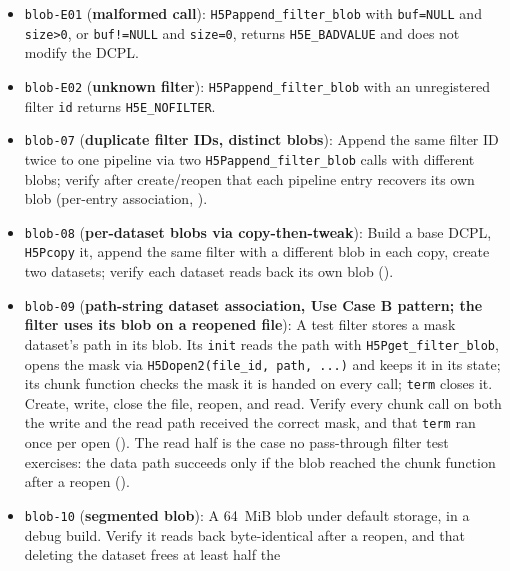 \documentclass[../RFC-HDFG-2026-003.tex]{subfiles}
\begin{document}
\begin{itemize}
  Configure a filter via \texttt{H5Pappend\_filter\_blob} with a
  multi-megabyte buffer using the default \texttt{H5HG}-based storage;
  verify create/open succeeds and the runtime chunk I/O path is
  unaffected (compression throughput on the same file is unchanged
  relative to an equivalent dataset without a blob).
\item \texttt{blob-E01} (\textbf{malformed call}):
  \texttt{H5Pappend\_filter\_blob} with \texttt{buf=NULL} and
  \texttt{size>0}, or \texttt{buf!=NULL} and \texttt{size=0}, returns
  \texttt{H5E\_BADVALUE} and does not modify the DCPL.
\item \texttt{blob-E02} (\textbf{unknown filter}):
  \texttt{H5Pappend\_filter\_blob} with an unregistered filter
  \texttt{id} returns \texttt{H5E\_NOFILTER}.
\item \texttt{blob-07} (\textbf{duplicate filter IDs, distinct blobs}):
  Append the same filter ID twice to one pipeline via two
  \texttt{H5Pappend\_filter\_blob} calls with different blobs; verify
  after create/reopen that each pipeline entry recovers its own blob
  (per-entry association, ).
\item \texttt{blob-08} (\textbf{per-dataset blobs via copy-then-tweak}):
  Build a base DCPL, \texttt{H5Pcopy} it, append the same filter with a
  different blob in each copy, create two datasets; verify each dataset
  reads back its own blob ().
\item \texttt{blob-09} (\textbf{path-string dataset association, Use
  Case B pattern; the filter uses its blob on a reopened file}): A test
  filter stores a mask dataset's path in its blob.  Its \texttt{init}
  reads the path with \texttt{H5Pget\_filter\_blob}, opens the mask via
  \texttt{H5Dopen2(file\_id, path, ...)} and keeps it in its state; its
  chunk function checks the mask it is handed on every call; \texttt{term}
  closes it.  Create, write, close the file, reopen, and read.  Verify
  every chunk call on both the write and the read path received the
  correct mask, and that \texttt{term} ran once per open
  ().  The read half
  is the case no pass-through filter test exercises: the data path
  succeeds only if the blob reached the chunk function after a reopen
  ().
\item \texttt{blob-10} (\textbf{segmented blob}): A 64~MiB blob under
  default storage, in a debug build.  Verify it reads back byte-identical
  after a reopen, and that deleting the dataset frees at least half the

\end{itemize}
\end{document}
